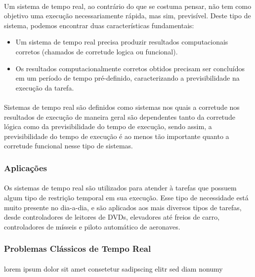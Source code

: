 \paragraph{}
Um sistema de tempo real, ao contrário do que se costuma pensar, não tem
como objetivo uma execução necessariamente rápida, mas sim, previsível.
Deste tipo de sistema, podemos encontrar duas características fundamentais:

\begin{itemize}
\item Um sistema de tempo real precisa produzir resultados computacionais corretos
(chamados de corretude logica ou funcional).
\item Os resultados computacionalmente corretos obtidos precisam ser concluídos em
um período de tempo pré-definido, caracterizando a previsibilidade na execução da tarefa.
\end{itemize}

\paragraph{}
Sistemas de tempo real são definidos como sistemas nos quais a corretude nos
resultados de execução de maneira geral são dependentes tanto da corretude
lógica como da previsibilidade do tempo de execução, sendo assim, a previsibilidade
do tempo de execução é ao menos tão importante quanto a corretude funcional
nesse tipo de sistemas.~\cite{Li:2003:RCE:829584}

\subsubsection{Aplicações}
\paragraph{}
Os sistemas de tempo real são utilizados para atender à tarefas que possuem algum tipo
de restrição temporal em sua execução. Esse tipo de necessidade está muito presente no
dia-a-dia, e são aplicados aos mais diversos tipos de tarefas, desde controladores de
leitores de DVDs, elevadores até freios de carro, controladores de mísseis e piloto automático
de aeronaves.

\subsubsection{Problemas Clássicos de Tempo Real}
\paragraph{}
lorem ipsum dolor sit amet consetetur sadipscing elitr sed diam nonumy


